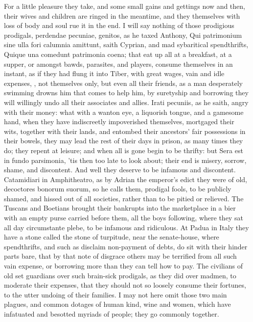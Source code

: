 {{For a little pleasure they take, and some small gains and gettings now
and then, their wives and children are ringed in the meantime, and they
themselves with loss of body and soul rue it in the end. I will say
nothing of those prodigious prodigals, perdendae pecuniae, genitos, as
he  taxed Anthony, Qui patrimonium sine ulla fori calumnia
amittunt, saith Cyprian, and mad sybaritical spendthrifts,
Quique una comedunt patrimonia coena; that eat up all at a breakfast,
at a supper, or amongst bawds, parasites, and players, consume
themselves in an instant, as if they had flung it into Tiber,
with great wages, vain and idle expenses, \etc{}, not themselves only, but
even all their friends, as a man desperately swimming drowns him that
comes to help him, by suretyship and borrowing they will willingly undo
all their associates and allies.  Irati pecuniis, as he saith,
angry with their money: what with a wanton eye, a liquorish
tongue, and a gamesome hand, when they have indiscreetly impoverished
themselves, mortgaged their wits, together with their lands, and
entombed their ancestors' fair possessions in their bowels, they may
lead the rest of their days in prison, as many times they do; they
repent at leisure; and when all is gone begin to be thrifty: but Sera
est in fundo parsimonia, 'tis then too late to look about; their
end is misery, sorrow, shame, and discontent. And well they
deserve to be infamous and discontent. Catamidiari in
Amphitheatro, as by Adrian the emperor's edict they were of old,
decoctores bonorum suorum, so he calls them, prodigal fools, to be
publicly shamed, and hissed out of all societies, rather than to be
pitied or relieved. The Tuscans and Boetians brought their
bankrupts into the marketplace in a bier with an empty purse carried
before them, all the boys following, where they sat all day
circumstante plebe, to be infamous and ridiculous. At Padua in
Italy they have a stone called the stone of turpitude, near the
senate-house, where spendthrifts, and such as disclaim non-payment of
debts, do sit with their hinder parts bare, that by that note of
disgrace others may be terrified from all such vain expense, or
borrowing more than they can tell how to pay. The civilians of
old set guardians over such brain-sick prodigals, as they did over
madmen, to moderate their expenses, that they should not so loosely
consume their fortunes, to the utter undoing of their families.
I may not here omit those two main plagues, and common dotages of human
kind, wine and women, which have infatuated and besotted myriads of
people; they go commonly together.

}}
